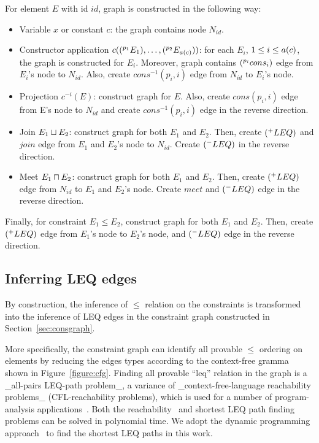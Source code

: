 For element $E$ with id $id$, graph is constructed in the following way:

\begin{itemize}
\item Variable $x$ or constant $c$: the graph contains node $N_{id}$. 

\item Constructor application $c((^{p_1}E_1), \dots,
(^{p_2}E_{a(c)}))$: for each $E_i$, $1\leq i \leq a(c)$,
the graph is constructed for $E_i$. Moreover, graph contains
$(^{p_i}cons_i)$ edge from $E_i$'s node to $N_{id}$.  Also, create
$cons^{-1}(p_i,i)$ edge from $N_{id}$ to $E_i$'s node.

\item Projection $c^{-i}(E)$: construct graph for $E$. Also, create
$cons(p_i,i)$ edge from E's node to $N_{id}$ and create $cons^{-1}(p_i,i)$ edge
in the reverse direction.

\item Join $E_1\sqcup E_2$: construct graph for both $E_1$ and $E_2$. Then,
create $(^{+}LEQ)$ and $join$ edge from $E_1$ and $E_2$'s node to
$N_{id}$. Create $(^{-}LEQ)$ in the reverse direction.

\item Meet $E_1\sqcap E_2$: construct graph for both $E_1$ and $E_2$. Then,
create $(^{+}LEQ)$ edge from $N_{id}$ to $E_1$ and $E_2$'s node. Create
$meet$ and $(^{-}LEQ)$ edge in the reverse direction.
\end{itemize}

Finally, for constraint $E_1\leq E_2$, construct graph for both $E_1$ and $E_2$. Then,
create $(^{+}LEQ)$ edge from $E_1$'s node to $E_2$'s node, and
$(^{-}LEQ)$ edge in the reverse direction.

\subsection{Inferring LEQ edges}
\label{sec:leqedge}

By construction, the inference of $\leq$ relation on the constraints is
transformed into the inference of LEQ edges in the constraint graph constructed
in Section~\ref{sec:consgraph}.

More specifically, the constraint graph can identify all provable $\leq$
ordering on elements by reducing the edges types according to the context-free
gramma shown in Figure~\ref{figure:cfg}. Finding all provable ``leq'' relation
in the graph is a _all-pairs LEQ-path problem_, a variance of
_context-free-language reachability problems_ (CFL-reachability problems),
which is used for a number of program-analysis applications~\cite{reps-graph}.
Both the reachability~\cite{melski-cflgraph} and shortest LEQ path
finding~\cite{barrett-cflpath} problems can be solved in polynomial time. We
adopt the dynamic programming approach~\cite{barrett-cflpath} to find the
shortest LEQ paths in this work. 

